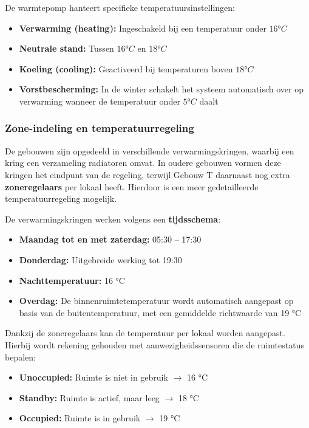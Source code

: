 De warmtepomp hanteert specifieke temperatuursinstellingen:

\begin{itemize}
    \item \textbf{Verwarming (heating):} Ingeschakeld bij een temperatuur onder $16°C$
    \item \textbf{Neutrale stand:} Tussen $16°C$ en $18°C$
    \item \textbf{Koeling (cooling):} Geactiveerd bij temperaturen boven $18°C$
    \item \textbf{Vorstbescherming:} In de winter schakelt het systeem automatisch over op verwarming wanneer de temperatuur onder $5°C$ daalt
\end{itemize}

\subsubsection{Zone-indeling en temperatuurregeling}
De gebouwen zijn opgedeeld in verschillende verwarmingskringen, waarbij een kring een verzameling radiatoren omvat. In oudere gebouwen vormen deze kringen het eindpunt van de regeling, terwijl Gebouw T daarnaast nog extra \textbf{zoneregelaars} per lokaal heeft. Hierdoor is een meer gedetailleerde temperatuurregeling mogelijk.

De verwarmingskringen werken volgens een \textbf{tijdsschema}:

\begin{itemize}
    \item \textbf{Maandag tot en met zaterdag:} 05:30 -- 17:30
    \item \textbf{Donderdag:} Uitgebreide werking tot 19:30
    \item \textbf{Nachttemperatuur:} 16 °C
    \item \textbf{Overdag:} De binnenruimtetemperatuur wordt automatisch aangepast op basis van de buitentemperatuur, met een gemiddelde richtwaarde van 19 °C
\end{itemize}

Dankzij de zoneregelaars kan de temperatuur per lokaal worden aangepast. Hierbij wordt rekening gehouden met aanwezigheidssensoren die de ruimtestatus bepalen:

\begin{itemize}
    \item \textbf{Unoccupied:} Ruimte is niet in gebruik $\rightarrow$ 16 °C
    \item \textbf{Standby:} Ruimte is actief, maar leeg $\rightarrow$ 18 °C
    \item \textbf{Occupied:} Ruimte is in gebruik $\rightarrow$ 19 °C
\end{itemize}

